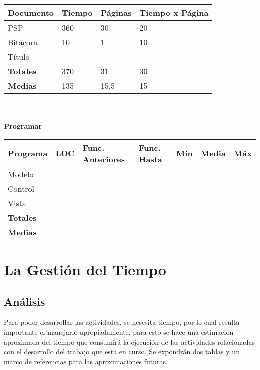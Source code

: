 \documentclass[a4paper,12pt,openany,oneside]{book}
\begin{document}
\begin{tabular}{| l | l | l | l |}
\hline
\textbf{Documento} & \textbf{Tiempo} & \textbf{Páginas} & \textbf{Tiempo x Página}\\
\hline
PSP & 360 & 30 & 20 \\
\hline
Bitácora & 10 & 1 & 10 \\
\hline
Título & & & \\
\hline
\textbf{Totales} & 370 & 31 & 30 \\
\hline
\textbf{Medias} & 135 & 15,5 & 15 \\
\hline
\end{tabular}
\\\\
\textbf{Programar}\\
\begin{tabular}{| l | l | l | l | l | l | l |}
\hline
\textbf{Programa} & \textbf{LOC} & \textbf{Func. Anteriores} & \textbf{Func. Hasta} & \textbf{Mín} & \textbf{Media} & \textbf{Máx}\\
\hline
Modelo & & & & & & \\
\hline
Control & & & & & & \\
\hline
Vista & & & & & & \\
\hline
\textbf{Totales} & & & & & & \\
\hline
\textbf{Medias} & & & & & & \\
\hline
\end{tabular}
\chapter{La Gestión del Tiempo}
\thispagestyle{empty}
\section{Análisis}
Para poder desarrollar las actividades, se nesesita tiempo, por lo cual resulta importante el manejarlo apropiadamente, para esto se hace una estimación aproximada del tiempo que consumirá la ejecución de las actividades relacionadas con el desarrollo del trabajo que esta en curso. Se expondrán dos tablas y un marco de referencias para las aproximaciones futuras.
\end{document}
